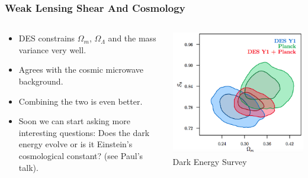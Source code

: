 \documentclass{beamer}
\begin{document}
\frame
{

    \frametitle{Weak Lensing Shear And Cosmology}


    \begin{columns}
        \begin{column}{0.5\textwidth}
            \begin{itemize}

                \item DES constrains {\color{gold} $\Omega_m$}, {\color{gold} $\Omega_\Lambda$}
                    and the mass variance very well.

                \item Agrees with the cosmic microwave background.
                    
                \item Combining the two is even better.

                \item Soon we can start asking more interesting questions: Does the
                    dark energy evolve or is it Einstein's cosmological constant? (see
                    Paul's talk).

            \end{itemize}

        \end{column}
        \begin{column}{0.5\textwidth}
            \begin{center}
                \includegraphics[width=\textwidth]{3x2-fig10.png}
                \newline
                {\tiny Dark Energy Survey}
            \end{center}
        \end{column}

    \end{columns}


}
\end{document}
